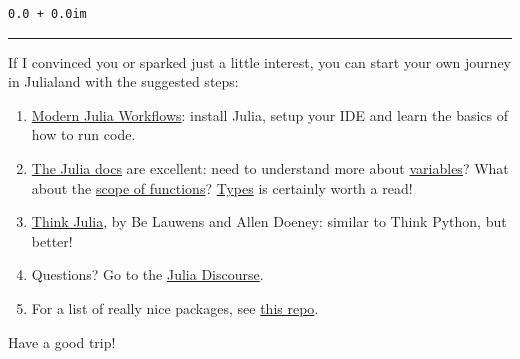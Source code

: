\documentclass[
  letterpaper,
  DIV=11,
  numbers=noendperiod]{scrartcl}
\providecommand{\tightlist}{%
  \setlength{\itemsep}{0pt}\setlength{\parskip}{0pt}}\usepackage{longtable,booktabs,array}
\begin{document}
\begin{verbatim}
0.0 + 0.0im
\end{verbatim}

\begin{center}\rule{0.5\linewidth}{0.5pt}\end{center}

If I convinced you or sparked just a little interest, you can start your
own journey in Julialand with the suggested steps:

\begin{enumerate}
\def\labelenumi{\arabic{enumi}.}
\tightlist
\item
  \href{https://modernjuliaworkflows.org}{Modern Julia Workflows}:
  install Julia, setup your IDE and learn the basics of how to run code.
\item
  \href{https://docs.julialang.org/en/v1/manual/getting-started/}{The
  Julia docs} are excellent: need to understand more about
  \href{https://docs.julialang.org/en/v1/manual/variables/}{variables}?
  What about the
  \href{https://docs.julialang.org/en/v1/manual/functions/}{scope of
  functions}?
  \href{https://docs.julialang.org/en/v1/manual/types/}{Types} is
  certainly worth a read!
\item
  \href{https://benlauwens.github.io/ThinkJulia.jl/latest/book.html}{Think
  Julia}, by Be Lauwens and Allen Doeney: similar to Think Python, but
  better!
\item
  Questions? Go to the \href{https://discourse.julialang.org/}{Julia
  Discourse}.
\item
  For a list of really nice packages, see
  \href{https://gensjulia.pages.dev/data-science/\#general-purpose}{this
  repo}.
\end{enumerate}

Have a good trip!
\end{document}

